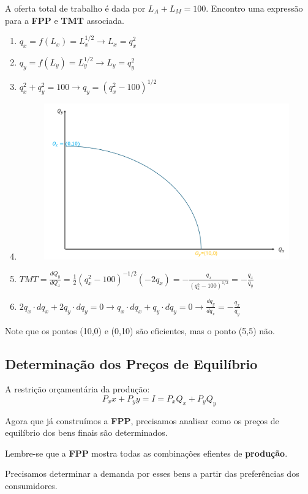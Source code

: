 \documentclass[a4paper,12pt]{article}[abntex2]
\begin{document}
A oferta total de trabalho é dada por $L_A+L_M=100$. Encontro uma expressão para a \textbf{FPP} e \textbf{TMT} associada.\begin{enumerate}
    \item \(q_x=f(L_x)=L_x^{1/2}\rightarrow L_x=q_x^2\)
    \item \(q_y=f(L_y)=L_y^{1/2}\rightarrow L_y=q_y^2\)
    \item \(q_x^2+q_y^2=100\rightarrow q_y=(q_x^2-100)^{1/2}\)
    \item 
\begin{figure}[H]
    \centering
    \includegraphics[width=0.7\linewidth]{Imagens/a5i6.png}
\end{figure}
    \item \(TMT=\frac{dQ_y}{dQ_x}=\frac{1}{2}(q_x^2-100)^{-1/2}(-2q_x)=-\frac{q_x}{(q_x^2-100)^{1/2}}=-\frac{q_x}{q_y}\)
    \item \(2q_x\cdot dq_x+2q_y\cdot dq_y=0\rightarrow q_x\cdot dq_x+q_y\cdot dq_y=0 \rightarrow \frac{dq_y}{dq_x}=-\frac{q_x}{q_y}\)
\end{enumerate}

Note que os pontos (10,0) e (0,10) são eficientes, mas o ponto (5,5) não.

\subsection{\textbf{Determinação dos Preços de Equilíbrio}}
A restrição orçamentária da produção:
\[
P_xx+P_yy=I=P_xQ_x+P_yQ_y
\]

Agora que já construímos a \textbf{FPP}, precisamos analisar como os preços de equilíbrio dos bens finais são determinados.

Lembre-se que a \textbf{FPP} mostra todas as combinações efientes de \textbf{produção}.

Precisamos determinar a demanda por esses bens a partir das preferências dos consumidores.
\end{document}
